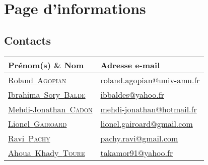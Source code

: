 \documentclass[11pt,fleqn]{book} %
\makeatletter
\newcommand{\rolandemail}{\href{mailto:roland.agopian@univ-amu.fr}{roland.agopian@univ-amu.fr}\xspace}
\newcommand{\raviemail}{\href{mailto:pachy.ravi@gmail.com}{pachy.ravi@gmail.com}\xspace}
\newcommand{\mjemail}{\href{mailto:mehdi-jonathan@hotmail.fr}{mehdi-jonathan@hotmail.fr}\xspace}
\newcommand{\lionelemail}{\href{mailto:lionel.gairoard@gmail.com}{lionel.gairoard@gmail.com}\xspace}
\newcommand{\ibrahimaemail}{\href{mailto:ibbaldes@yahoo.fr}{ibbaldes@yahoo.fr}\xspace}
\newcommand{\khadyemail}{\href{mailto:takamor91@yahoo.fr}{takamor91@yahoo.fr}\xspace}
\newcommand{\roland}{\href{mailto:roland.agopian@univ-amu.fr}{Roland~\textsc{Agopian}}\xspace}
\newcommand{\ravi}{\href{mailto:pachy.ravi@gmail.com}{Ravi~\textsc{Pachy}}\xspace}
\newcommand{\mj}{\href{mailto:mehdi-jonathan@hotmail.fr}{Mehdi-Jonathan~\textsc{Cadon}}\xspace}
\newcommand{\lionel}{\href{mailto:lionel.gairoard@gmail.com}{Lionel~\textsc{Gairoard}}\xspace}
\newcommand{\ibrahima}{\href{mailto:ibbaldes@yahoo.fr}{Ibrahima~Sory~\textsc{Balde}}\xspace}
\newcommand{\khady}{\href{mailto:takamor91@yahoo.fr}{Ahoua~Khady~\textsc{Toure}}\xspace}
\makeatother
\begin{document}






\newpage

\pagestyle{empty} %

\chapter*{Page d'informations}

\section*{Contacts}
\begin{tabularx}{\linewidth}{X X}
	\toprule
	Prénom(s) \& Nom & Adresse e-mail \\
	\midrule
	\roland & \rolandemail \\
	\hline
	\ibrahima & \ibrahimaemail \\
	\hline
	\mj & \mjemail \\
	\hline
	\lionel & \lionelemail \\
	\hline
	\ravi & \raviemail \\
	\hline
	\khady & \khadyemail \\
	\bottomrule
\end{tabularx}
\end{document}
